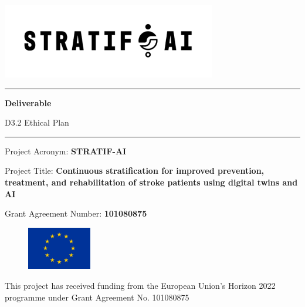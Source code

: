 \begin{center}
\includegraphics[width=0.7\textwidth]{stratifai_logo.png}    
\end{center}

\hrule
\vspace{0.2cm}

\begin{center}
\huge \textbf{Deliverable}
\end{center}

\begin{center}
\Large D3.2 Ethical Plan
\end{center}

\vspace{0.2cm}
\hrule

\vspace{0.2cm}

\large \noindent Project Acronym: \textbf{STRATIF-AI}  

\vspace{0.2cm}

\large \noindent Project Title: \textbf{Continuous stratification for improved prevention, treatment, and rehabilitation of stroke patients using digital twins and AI}  

\vspace{0.2cm}

\large \noindent Grant Agreement Number: \textbf{101080875} 

\vspace{0.2cm}

\begin{figure}
  \includegraphics[width=0.25\textwidth]{EU_flag.jpg}
\end{figure}

\noindent \newline \newline \small This project has received funding from the European Union’s Horizon 2022 programme under Grant Agreement No. 101080875

